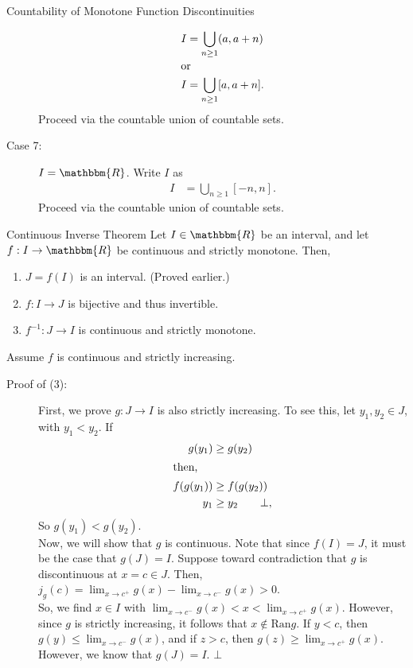 \documentclass[10pt]{extarticle}
\newcommand{\ran}{\text{Ran}}
\newcommand{\R}{\mathbbm{R}}
\begin{document}
\begin{problem}{Countability of Monotone Function Discontinuities}
\begin{description}
\begin{align*}
          I &= \bigcup_{n\geq 1} (a,a+n)\\
          \shortintertext{or}
          I &= \bigcup_{n\geq 1}[a,a+n].
        \end{align*}
        Proceed via the countable union of countable sets.
      \item[Case 7:] $I = \R$. Write $I$ as
        \begin{align*}
          I &= \bigcup_{n\geq 1}[-n,n].
        \end{align*}
        Proceed via the countable union of countable sets.
    \end{description}
  \end{problem}
  \begin{problem}{Continuous Inverse Theorem}
    Let $I\in\R$ be an interval, and let $f: I\rightarrow \R$ be continuous and strictly monotone. Then,
    \begin{enumerate}[(1)]
      \item $J = f(I)$ is an interval. (Proved earlier.)
      \item $f: I\rightarrow J$ is bijective and thus invertible.
      \item $f^{-1}: J\rightarrow I$ is continuous and strictly monotone.
    \end{enumerate}
    \tcblower
    Assume $f$ is continuous and strictly increasing.
    \begin{description}
      \item[Proof of (3):] First, we prove $g: J\rightarrow I$ is also strictly increasing. To see this, let $y_1,y_2\in J$, with $y_1 < y_2$. If
        \begin{align*}
          g(y_1) &\geq g(y_2)\\
          \shortintertext{then,}
          f(g(y_1)) &\geq f(g(y_2))\\
          y_1 &\geq y_2 \tag*{$\bot$},
        \end{align*}
        So $g(y_1) < g(y_2)$.\\

        Now, we will show that $g$ is continuous. Note that since $f(I) = J$, it must be the case that $g(J) = I$. Suppose toward contradiction that $g$ is discontinuous at $x=c\in J$. Then, $j_g(c) = \lim_{x\rightarrow c^{+}}g(x) - \lim_{x\rightarrow c^{-}}g(x)> 0$.\\

        So, we find $x\in I$ with $\lim_{x\rightarrow c^{-}}g(x)<x<\lim_{x\rightarrow c^{+}}g(x)$. However, since $g$ is strictly increasing, it follows that $x\notin \ran{g}$. If $y < c$, then $g(y) \leq \lim_{x\rightarrow c^{-}}g(x)$, and if $z > c$, then $g(z) \geq \lim_{x\rightarrow c^{+}}g(x)$. However, we know that $g(J) = I$. $\bot$
    \end{description}
  \end{problem}
\end{document}
